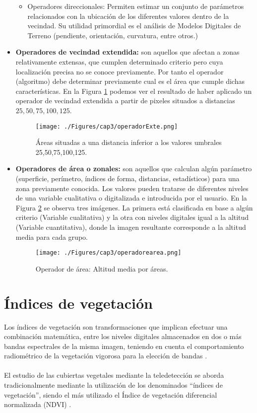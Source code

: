 \begin{itemize}
\begin{itemize}
			\item Operadores direccionales: Permiten estimar un conjunto de par\'ametros relacionados con la ubicaci\'on de los diferentes valores dentro de la vecindad. Su utilidad primordial es el an\'alisis de Modelos Digitales de Terreno (pendiente, orientación, curvatura, entre otros.)
		\end{itemize}		
		\item  \textbf{Operadores de vecindad extendida:} son aquellos que afectan a zonas relativamente extensas, que cumplen determinado criterio pero cuya localizaci\'on precisa no se conoce previamente. Por tanto el operador (algoritmo) debe determinar previamente cual es el \'area que cumple dichas caracter\'isticas. En la Figura \ref{fig:oplvecext} podemos ver el resultado de haber aplicado un operador de vecindad extendida a partir de pixeles situados a distancias $ 25,50,75,100,125 $.
						  \begin{figure}[H]
						  	\centering
						  	\texttt{[image: ./Figures/cap3/operadorExte.png]}
						  	\caption{\'Areas situadas a una distancia inferior a los valores umbrales 25,50,75,100,125.}
						  	\label{fig:oplvecext}
						  \end{figure}		
		\item \textbf{Operadores de \'area o zonales:} son aquellos que calculan alg\'un par\'ametro (superficie, per\'imetro, \'indices de forma, distancias, estad\'isticos) para una zona previamente conocida. Los valores pueden tratarse de diferentes niveles de una variable cualitativa o digitalizada e introducida por el usuario. En la Figura \ref{fig:oplarea} se observa tres im\'agenes. La primera est\'a clasificada en base a alg\'un criterio (Variable cualitativa) y la otra con niveles digitales igual a la altitud (Variable cuantitativa), donde la imagen resultante corresponde a la altitud media para cada grupo.
								  \begin{figure}[H]
								  	\centering
								  	\texttt{[image: ./Figures/cap3/operadorearea.png]}
								  	\caption{Operador de \'area: Altitud media por \'areas.}
								  	\label{fig:oplarea}
								  \end{figure}		
		
		\end{itemize}
 
\section{\'Indices de vegetaci\'on}
Los \'indices de vegetaci\'on son transformaciones que implican efectuar una combinaci\'on matem\'atica, entre los niveles digitales almacenados en dos o m\'as bandas espectrales de la misma imagen, teniendo en cuenta el comportamiento radiom\'etrico de la vegetaci\'on vigorosa para la elecci\'on de bandas \cite{speranza2005potencialidad}. \\~\\
El estudio de las cubiertas vegetales mediante la teledetecci\'on se aborda tradicionalmente mediante la utilización de los denominados “índices de vegetaci\'on”, siendo el m\'as utilizado el \'Indice de vegetaci\'on diferencial normalizada (NDVI) \cite{sader2000estimacion}.

